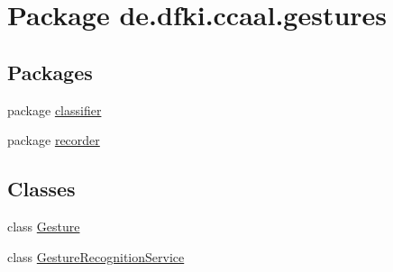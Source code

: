 \hypertarget{namespacede_1_1dfki_1_1ccaal_1_1gestures}{\section{Package de.\-dfki.\-ccaal.\-gestures}
\label{namespacede_1_1dfki_1_1ccaal_1_1gestures}
}
\subsection*{Packages}
\begin{DoxyCompactItemize}
\item 
package \hyperlink{namespacede_1_1dfki_1_1ccaal_1_1gestures_1_1classifier}{classifier}
\item 
package \hyperlink{namespacede_1_1dfki_1_1ccaal_1_1gestures_1_1recorder}{recorder}
\end{DoxyCompactItemize}
\subsection*{Classes}
\begin{DoxyCompactItemize}
\item 
class \hyperlink{classde_1_1dfki_1_1ccaal_1_1gestures_1_1_gesture}{Gesture}
\item 
class \hyperlink{classde_1_1dfki_1_1ccaal_1_1gestures_1_1_gesture_recognition_service}{Gesture\-Recognition\-Service}
\end{DoxyCompactItemize}
